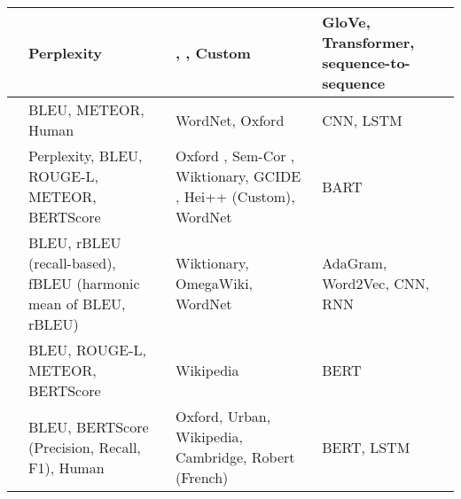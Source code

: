 \begin{longtable}{|p{3.5cm}|p{3.5cm}|p{3.5cm}|p{3.5cm}|}
    \hline
    \citeauthor{mickus_mark_2019} \citeyear{mickus_mark_2019} \cite{mickus_mark_2019}                                        & Perplexity                                                       & \cite{noraset_definition_2016}, \cite{gadetsky_conditional_2018}, Custom                                                                      & GloVe, Transformer, sequence-to-sequence \\
    \hline
    \citeauthor{li_explicit_2020} \citeyear{li_explicit_2020} \cite{li_explicit_2020}                                        & BLEU, METEOR, Human                                              & WordNet, Oxford                                                                                                                               & CNN, LSTM                                \\
    \hline
    \citeauthor{bevilacqua_generationary_2020} \citeyear{bevilacqua_generationary_2020} \cite{bevilacqua_generationary_2020} & Perplexity, BLEU, ROUGE-L, METEOR, BERTScore                     & Oxford \cite{chang_what_2019}, Sem-Cor \cite{miller_semantic_1993}, Wiktionary, GCIDE \cite{noraset_definition_2016}, Hei++ (Custom), WordNet & BART                                     \\
    \hline
    \citeauthor{sojka_evaluating_2020} \citeyear{sojka_evaluating_2020} \cite{sojka_evaluating_2020}                         & BLEU, rBLEU (recall-based), fBLEU (harmonic mean of BLEU, rBLEU) & Wiktionary, OmegaWiki, WordNet                                                                                                                & AdaGram, Word2Vec, CNN, RNN              \\
    \hline
    \citeauthor{huang_cdm_2021} \citeyear{huang_cdm_2021} \cite{huang_cdm_2021}                                              & BLEU, ROUGE-L, METEOR, BERTScore                                 & Wikipedia                                                                                                                                     & BERT                                     \\
    \hline
    \citeauthor{reid_vcdm_2020} \citeyear{reid_vcdm_2020} \cite{reid_vcdm_2020}                                              & BLEU, BERTScore (Precision, Recall, F1), Human                   & Oxford, Urban, Wikipedia, Cambridge, Robert (French)                                                                                          & BERT, LSTM                               \\
    \hline
\end{longtable}

